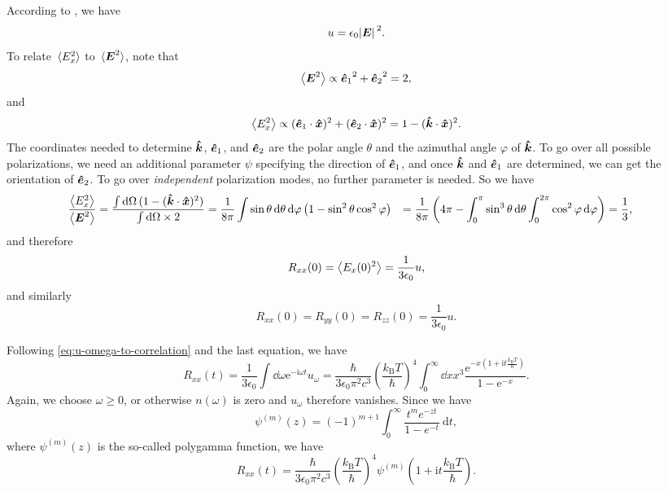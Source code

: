 \documentclass[hyperref, a4paper]{article}
\newcommand*{\ii}{\mathrm{i}}
\newcommand*{\ee}{\mathrm{e}}
\def\\{}%
\newcommand{\kB}{k_{\text{B}}}
\begin{document}
According to , 
we have 
\begin{equation}
    u = \epsilon_0 \abs*{\vb*{E}}^2 .
\end{equation}
To relate $\expval*{E_x^2}$ to $\expval*{\vb*{E}^2}$, note that 
\[
    \expval{\vb*{E}^2} \propto {\vu*{e}_1}^2 + {\vu*{e}_2}^2 = 2, 
\]
and 
\[
    \expval{E_x^2} \propto (\vu*{e}_1 \cdot \vu*{x})^2 +  (\vu*{e}_2 \cdot \vu*{x})^2
    = 1 - (\vu*{k} \cdot \vu*{x})^2.
\]
The coordinates needed to determine $\vu*{k}$, $\vu*{e}_1$, and $\vu*{e}_2$ 
are the polar angle $\theta$ and the azimuthal angle $\varphi$ of $\vu*{k}$.
To go over all possible polarizations,
we need an additional parameter $\psi$ specifying the direction of $\vu*{e}_1$,
and once $\vu*{k}$ and $\vu*{e}_1$ are determined,
we can get the orientation of $\vu*{e}_2$.
To go over \emph{independent} polarization modes, 
no further parameter is needed.
So we have 
\[
    \begin{aligned}
        \frac{\expval{E_x^2}}{\expval{\vb*{E}^2}}
        &= \frac{
            \int \dd{\Omega} (1 - (\vu*{k} \cdot \vu*{x})^2)
        }{ \int \dd{\Omega} \times 2 } = \frac{1}{8\pi} \int \sin \theta \dd{\theta} \dd{\varphi} 
        \left(
            1 - \sin^2 \theta \cos^2 \varphi
        \right) \\
        &= \frac{1}{8\pi} \left(
            4\pi - \int_0^\pi \sin^3 \theta \dd{\theta} \int_0^{2\pi} \cos^2 \varphi \dd{\varphi}
        \right) \\
        &= \frac{1}{3},
    \end{aligned}
\]
and therefore 
\begin{equation}
    R_{xx}(0) = \expval{E_x(0)^2} = \frac{1}{3 \epsilon_0} u,  
\end{equation}
and similarly 
\begin{equation}
    R_{xx}(0) = R_{yy}(0) = R_{zz}(0) = \frac{1}{3 \epsilon_0} u.
\end{equation}

Following \eqref{eq:u-omega-to-correlation} and the last equation, we have 
\begin{equation}
    R_{xx} (t) = \frac{1}{3 \epsilon_0} \int \dd{\omega}  \ee^{- \ii \omega t} u_\omega
    = \frac{\hbar}{3 \epsilon_0 \pi^2 c^3} 
    \left(\frac{\kB T}{\hbar}\right)^4
    \int_0^\infty \dd{x} x^3 
    \frac{
        \ee^{- x \left(1 + \ii t \frac{\kB T}{\hbar} \right)}
    }{1 - \ee^{-x}} .
\end{equation}
Again, we choose $\omega \geq 0$,
or otherwise $n(\omega)$ is zero and $u_\omega$ therefore vanishes.
Since we have 
\begin{equation}
    \psi^{(m)}(z)=(-1)^{m+1} \int_0^{\infty} \frac{t^m e^{-z t}}{1-e^{-t}} \mathrm{~d} t,
\end{equation}
where $\psi^{(m)}(z)$ is the so-called polygamma function, 
we have 
\begin{equation}
    R_{xx}(t) = \frac{\hbar}{3 \epsilon_0 \pi^2 c^3} 
    \left(\frac{\kB T}{\hbar}\right)^4
    \psi^{(m)}\left(
        1 + \ii t \frac{\kB T}{\hbar}
    \right).
\end{equation}
\end{document}
